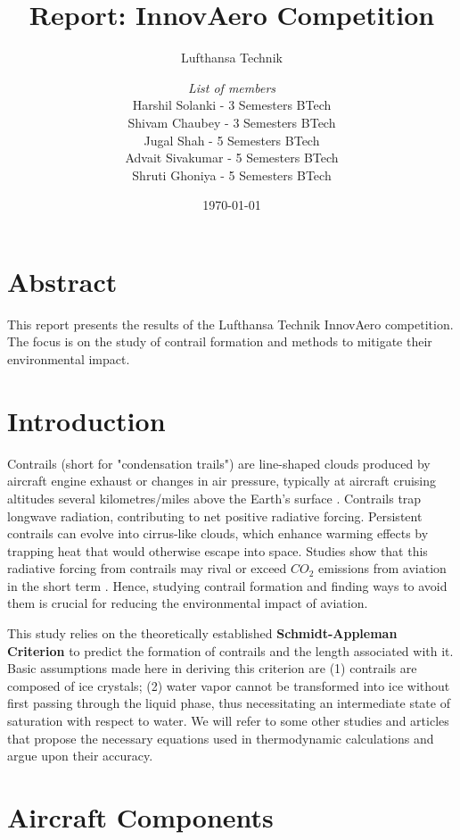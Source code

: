\documentclass[a4paper, 12pt]{report}
\institute{{\bfseries\Huge Team Rakshak}\\\vspace{10pt}Indian Institute of Technology Bombay}
\title{Report: InnovAero Competition}
\subtitle{Lufthansa Technik}
\author{\textit{List of members}\\
        Harshil Solanki - 3 Semesters BTech\\
        Shivam Chaubey - 3 Semesters BTech\\
        Jugal Shah - 5 Semesters BTech\\
        Advait Sivakumar - 5 Semesters BTech\\
        Shruti Ghoniya - 5 Semesters BTech
}
\date{\today}
\begin{document}
\maketitle
\romantableofcontents

\chapter{Abstract}
This report presents the results of the Lufthansa Technik InnovAero competition. The focus is on the study of contrail formation and methods to mitigate their environmental impact.


\chapter{Introduction}
Contrails (short for "condensation trails") are line-shaped clouds produced by aircraft engine exhaust or changes in air pressure, typically at aircraft cruising altitudes several kilometres/miles above the Earth's surface \cite{enwiki:1250066651}. Contrails trap longwave radiation, contributing to net positive radiative forcing. Persistent contrails can evolve into cirrus-like clouds, which enhance warming effects by trapping heat that would otherwise escape into space. Studies show that this radiative forcing from contrails may rival or exceed $CO_2$ emissions from aviation in the short term \cite{acp}. Hence, studying contrail formation and finding ways to avoid them is crucial for reducing the environmental impact of aviation.

This study relies on the theoretically established \textbf{Schmidt-Appleman Criterion} \cite{appleman1953formation} to predict the formation of contrails and the length associated with it. Basic assumptions made here in deriving this criterion are (1) contrails are composed of ice crystals; (2) water vapor cannot be transformed into ice without first passing through the liquid phase, thus necessitating an intermediate state of saturation with respect to water. We will refer to some other studies and articles that propose the necessary equations used in thermodynamic calculations and argue upon their accuracy.

\chapter{Aircraft Components}
\end{document}
